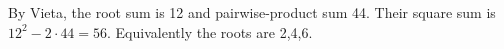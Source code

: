 By Vieta, the root sum is 12 and pairwise-product sum 44. Their square sum is $12^2-2\cdot44=\boxed{56}$. Equivalently the roots are 2,4,6.
